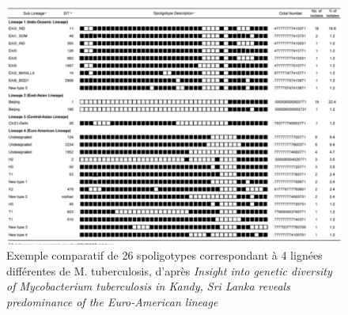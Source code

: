 \documentclass[twoside,a4paper,11pt,frenchb,openany]{report}
\begin{document}
\begin{figure}[h!]
\includegraphics[scale=0.4]{comparaison.png}
\caption{Exemple comparatif de 26 spoligotypes correspondant à 4 lignées différentes de M. tuberculosis, d'après \textit{Insight into genetic diversity of Mycobacterium tuberculosis in Kandy, Sri Lanka reveals predominance of the Euro-American lineage}}
\end{figure}


\end{document}
